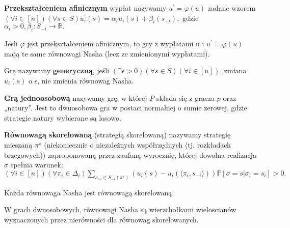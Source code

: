 \begin{definicja}
    \textbf{Przekształceniem afinicznym} wypłat nazywamy $u^{\prime} = \varphi(u)$ zadane wzorem $(\forall i \in [n])(\forall s \in S)u_i^{\prime}(s) = \alpha_i u_i(s) + \beta_i(s_{-i}),$ gdzie $\alpha_i > 0, \beta_i : S_{-i} \rightarrow \mathbb{R}.$ 
\end{definicja}

\begin{twierdzenie}
    Jesli $\varphi$ jest przekształceniem afinicznym, to gry z wypłatami u i $u^{\prime} = \varphi(u)$ mają te same równowagi Nasha (lecz ze zmienionymi wypłatami).
\end{twierdzenie}

\begin{definicja}
    Grę nazywamy \textbf{generyczną}, jeśli $(\exists \epsilon > 0)(\forall s \in S)(\forall i \in [n])$, zmiana $u_i(s)$ o $\epsilon$, nie zmienia równowag Nasha.
\end{definicja}

\begin{definicja}
    \textbf{Grą jednoosobową} nazywamy grę, w której $P$ składa się z gracza $p$ oraz „natury”. Jest to dwuosobowa gra w postaci normalnej o sumie zerowej, gdzie strategie natury wybierane są losowo.
\end{definicja}

\begin{definicja}
    \textbf{Równowagą skorelowaną} (strategią skorelowaną) nazywamy strategię mieszaną $\pi^{\star}$
    (niekoniecznie o niezależnych współrzędnych (tj. rozkładach brzegowych)) zaproponowaną przez zaufaną wyrocznię, której dowolna realizacja $\sigma$ spełnia warunek: $(\forall i \in [n])(\forall \pi_i \in \Delta_i) \sum_{s_{-i} \in S_{-i}(\pi^{\star})} (u_i(s) - u_i(\langle \pi_i, s_{-i} \rangle)) \mathbb{P}[\sigma = s | \sigma_i = s_i] > 0.$
\end{definicja}

\begin{twierdzenie}
    Każda równowaga Nasha jest równowagą skorelowaną. 
\end{twierdzenie}


\begin{twierdzenie}
    W grach dwuosobowych, równowagi Nasha są wierzchołkami wieloscianów wyznaczonych przez nierówności dla równowag skorelowanych.
\end{twierdzenie}